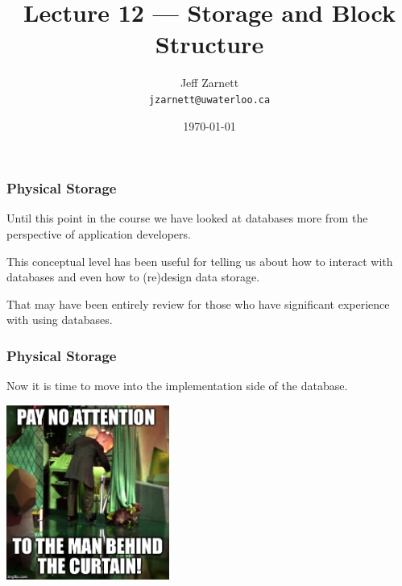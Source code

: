 

\title{Lecture 12 --- Storage and Block Structure }

\author{Jeff Zarnett \\ \small \texttt{jzarnett@uwaterloo.ca}}
\date{\today}




\begin{frame}
  \titlepage

 \end{frame}



\begin{frame}
\frametitle{Physical Storage}

Until this point in the course we have looked at databases more from the perspective of application developers.

This conceptual level has been useful for telling us about how to interact with databases and even how to (re)design data storage. 

That may have been entirely review for those who have significant experience with using databases. 

 \end{frame}



\begin{frame}
\frametitle{Physical Storage}


Now it is time to move into the implementation side of the database. 

\begin{center}
	\includegraphics[width=0.4\textwidth]{images/curtain.jpg}
\end{center}

\end{frame}



